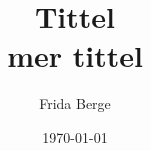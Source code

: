 \documentclass{article}%
\title{Tittel \\ mer tittel}%
\author{Frida Berge}%
\date{\today}%
\begin{document}
%
\normalsize%
%
\maketitle%
\end{document}
